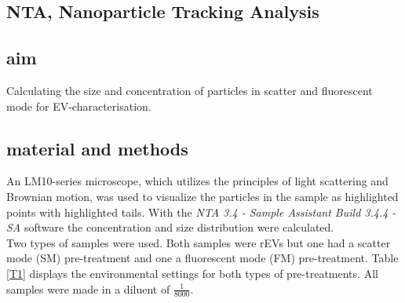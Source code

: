 \documentclass[dutch, a4paper, 11pt]{article}
\begin{document}
\begin{multicols}{2}  %


\section{NTA, Nanoparticle Tracking Analysis}

\subsection{aim}

Calculating the size and concentration of particles in scatter and fluorescent mode for EV-characterisation.

\subsection{material and methods}

An LM10-series microscope, which utilizes the principles of light scattering and Brownian motion, was used to visualize the particles in the sample as highlighted points with highlighted tails. With the \emph{NTA 3.4 - Sample Assistant Build 3.4.4 - SA} software the concentration and size distribution were calculated.\\
Two types of samples were used. Both samples were rEVs but one had a scatter mode (SM) pre-treatment and one a fluorescent mode (FM) pre-treatment. Table \ref{T1} displays the environmental settings for both types of pre-treatments. All samples were made in a diluent of $\frac{1}{8000}$.

\begin{table}[H]
\caption{Environmental settings}
\label{T1}
\end{table}


\end{multicols}
\end{document}
